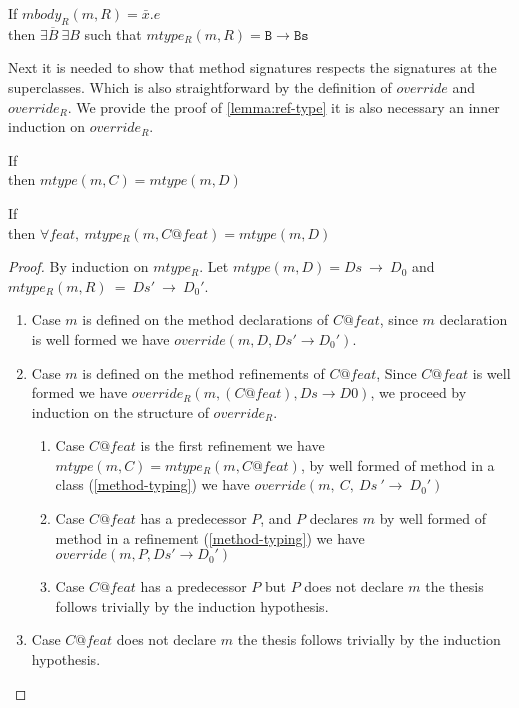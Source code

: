 \begin{lemma}
    If $mbody_R(m, R) = \bar{x} . e $ \\
    then $\exists \overline{B}~\exists B$ such that
        $mtype_R(m, R) = \mathtt{B} \rightarrow \mathtt{Bs}$
\end{lemma}

Next it is needed to show that method signatures respects the signatures
at the superclasses. Which is also straightforward by the definition of
$override$ and $override_R$. We provide the proof of \cref{lemma:ref-type} it 
is also necessary an inner induction on $override_R$.

\begin{lemma}
    If  \\
    then $mtype(m, C) = mtype(m, D)$        
\end{lemma}

\begin{lemma}\label{lemma:ref-type}
    If  \\
        then $\forall feat,~mtype_R(m, C@feat) = mtype(m, D)$        
\end{lemma}
\begin{proof}
    By induction on $mtype_R$. Let $mtype(m,D)=Ds~\rightarrow~D_0$ and
    $mtype_R(m,R)~=~Ds'~\rightarrow~D_0'$.
    \begin{enumerate}
        \item Case $m$ is defined on the method declarations of $C@feat$, since $m$ declaration is well formed we have $override(m, D, Ds' \rightarrow D_0')$.
        \item Case $m$ is defined on the method refinements of $C@feat$,
            Since $C@feat$ is well formed we have $override_R(m, (C@feat), Ds \rightarrow D0)$,
            we proceed by induction on the structure of $override_R$.
        \begin{enumerate}
            \item Case $C@feat$ is the first refinement we have $mtype(m, C) = mtype_R(m, C@feat)$, by well formed of method in a class (\cref{method-typing}) we have $override(m,~C,~Ds~'\rightarrow~D_0')$
            \item Case $C@feat$ has a predecessor $P$, and $P$ declares $m$
                by well formed of method in a refinement (\cref{method-typing}) we have $override(m, P, Ds' \rightarrow D_0')$
            \item Case $C@feat$ has a predecessor $P$ but $P$ does not declare $m$ the thesis follows trivially by the induction hypothesis.
        \end{enumerate}
        \item Case $C@feat$ does not declare $m$ the thesis follows trivially by the induction hypothesis.
    \end{enumerate}
\end{proof}

